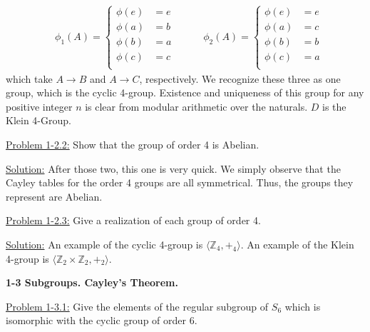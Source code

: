 \documentclass[12pt]{article}
\begin{document}
\begin{align*}
    &\phi_1(A) = \begin{cases}
                \phi(e) &= e\\
                \phi(a) &= b\\
                \phi(b) &= a\\
                \phi(c) &= c\\
                \end{cases} \quad \quad 
    &\phi_2(A) = \begin{cases}
                \phi(e) &= e\\
                \phi(a) &= c\\
                \phi(b) &= b\\
                \phi(c) &= a\\
                \end{cases}
\end{align*}
which take $A \rightarrow B$ and $A \rightarrow C$, respectively. We recognize
these three as one group, which is the cyclic 4-group. Existence and uniqueness
of this group for any positive integer $n$ is clear from modular arithmetic
over the naturals. $D$ is the Klein 4-Group.

\underline{Problem 1-2.2:} Show that the group of order 4 is Abelian.

\underline{Solution:} After those two, this one is very quick. We simply
observe that the Cayley tables for the order 4 groups are all symmetrical.
Thus, the groups they represent are Abelian.

\underline{Problem 1-2.3:} Give a realization of each group of order 4.

\underline{Solution:} An example of the cyclic 4-group is
$\langle \mathbb{Z}_4 , +_4 \rangle$. An example of the Klein 4-group is
$\langle \mathbb{Z}_2 \times \mathbb{Z}_2 , +_2 \rangle $.

\textbf{1-3 Subgroups. Cayley's Theorem.}

\underline{Problem 1-3.1:} Give the elements of the regular subgroup of $S_6$
which is isomorphic with the cyclic group of order 6.
\end{document}
